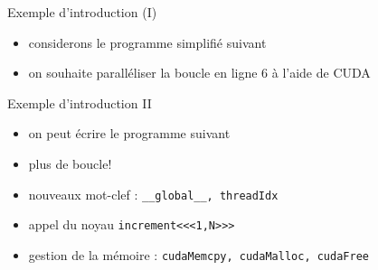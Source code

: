 \documentclass[11pt,mathserif]{beamer}
\begin{document}
\begin{frame}{Exemple d'introduction (I)}
\pause
\begin{itemize}[<+->]
 \item considerons le programme simplifié suivant

\item on souhaite paralléliser la boucle en ligne 6 à l'aide de CUDA
\end{itemize}
\end{frame}
\begin{frame}{Exemple d'introduction II }
\pause
\begin{itemize}[<+->]
 \item on peut écrire le programme suivant

\item plus de boucle!
\item nouveaux mot-clef : \texttt{\_\_global\_\_, threadIdx}
\item appel du noyau \texttt{increment<<<1,N>>>}
\item gestion de la mémoire : \texttt{cudaMemcpy, cudaMalloc, cudaFree}
\end{itemize}
\end{frame}
\end{document}
